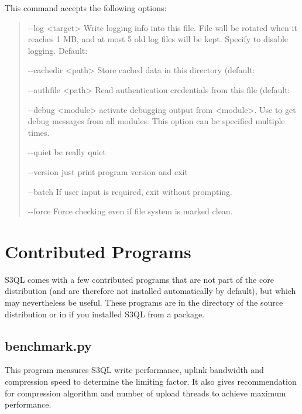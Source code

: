 \documentclass[letterpaper,10pt,english]{sphinxmanual}
\begin{document}
This command accepts the following options:
\begin{quote}
\begin{optionlist}{3cm}
\item [-{-}log \textless{}target\textgreater{}]  
Write logging info into this file. File will be rotated
when it reaches 1 MB, and at most 5 old log files will be
kept. Specify  to disable logging. Default:
\item [-{-}cachedir \textless{}path\textgreater{}]  
Store cached data in this directory (default: 
\item [-{-}authfile \textless{}path\textgreater{}]  
Read authentication credentials from this file (default:
\item [-{-}debug \textless{}module\textgreater{}]  
activate debugging output from \textless{}module\textgreater{}. Use  to get
debug messages from all modules. This option can be
specified multiple times.
\item [-{-}quiet]  
be really quiet
\item [-{-}version]  
just print program version and exit
\item [-{-}batch]  
If user input is required, exit without prompting.
\item [-{-}force]  
Force checking even if file system is marked clean.
\end{optionlist}
\end{quote}


\chapter{Contributed Programs}
\label{contrib:contributed-programs}\label{contrib::doc}
S3QL comes with a few contributed programs that are not part of the
core distribution (and are therefore not installed automatically by
default), but which may nevertheless be useful. These programs are in
the  directory of the source distribution or in
 if you installed S3QL from a package.


\section{benchmark.py}
\label{contrib:benchmark-py}
This program measures S3QL write performance, uplink bandwidth and
compression speed to determine the limiting factor. It also gives
recommendation for compression algorithm and number of upload threads
to achieve maximum performance.
\end{document}
